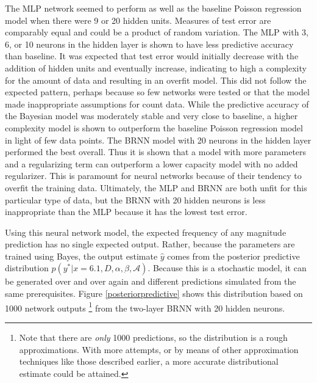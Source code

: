 The MLP network seemed to perform as well as the baseline Poisson regression model when there were 9 or 20 hidden units.  Measures of test error are comparably equal and could be a product of random variation.  The MLP with 3, 6, or 10 neurons in the hidden layer is shown to have less predictive accuracy than baseline.  It was expected that test error would initially decrease with the addition of hidden units and eventually increase, indicating to high a complexity for the amount of data and resulting in an overfit model.  This did not follow the expected pattern, perhaps because so few networks were tested or that the model made inappropriate assumptions for count data.
While the predictive accuracy of the Bayesian model was moderately stable and very close to baseline, a higher complexity model is shown to outperform the baseline Poisson regression model in light of few data points.  The BRNN model with 20 neurons in the hidden layer performed the best overall.  Thus it is shown that a model with more parameters and a regularizing term can outperform a lower capacity model with no added regularizer.  This is paramount for neural networks because of their tendency to overfit the training data.  Ultimately, the MLP and BRNN are both unfit for this particular type of data, but the BRNN with 20 hidden neurons is less inappropriate than the MLP because it has the lowest test error.

Using this neural network model, the expected frequency of any magnitude prediction has no single expected output.  Rather, because the parameters are trained using Bayes, the output estimate $\hat{y}$ comes from the posterior predictive distribution $p(y^*|x=6.1,D,\alpha,\beta,\mathcal{A})$.  Because this is a stochastic model, it can be generated over and over again and different predictions simulated from the same prerequisites.  Figure \ref{posteriorpredictive} shows this distribution based on 1000 network outputs 
\footnote{Note that there are \textit{only} 1000 predictions, so the distribution is a rough approximations.  With more attempts, or by means of other approximation techniques like those described earlier, a more accurate distributional estimate could be attained.}
 from the two-layer BRNN with 20 hidden neurons.

